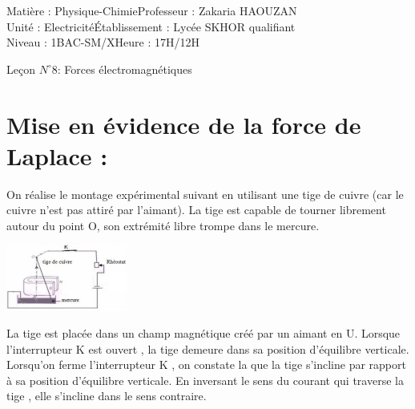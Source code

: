 \documentclass[12pt]{article}
\author{Zakaria HAOUZAN}
\date{\today}
\newcommand\headerMe[2]{\noindent{}#1\hfill#2}
\begin{document}
\headerMe{Matière : Physique-Chimie}{Professeur : Zakaria HAOUZAN}\\
\headerMe{Unité : Electricité}{Établissement : Lycée SKHOR qualifiant}\\
\headerMe{Niveau : 1BAC-SM/X}{Heure : 17H/12H}\\




\begin{center}

    \Large{Leçon $N^{\circ} 8 $: \color{red}Forces électromagnétiques }
\end{center}

  \section{ Mise en évidence de la force de Laplace :}
On réalise le montage expérimental suivant en utilisant une tige de cuivre (car le cuivre n'est pas attiré par l'aimant).
La tige est capable de tourner librement autour du point O, son extrémité libre trompe dans le mercure.
  \begin{center}
    \includegraphics[width=0.3\textwidth]{./img/foce_B.png}
  \end{center}
La tige est placée dans un champ magnétique créé par un aimant en U.
Lorsque l'interrupteur K est ouvert , la tige demeure dans sa position d'équilibre verticale. Lorsqu'on ferme
l'interrupteur K , on constate la que la tige s'incline par rapport à sa position d'équilibre verticale.
En inversant le sens du courant qui traverse la tige , elle s'incline dans le sens contraire.
\end{document}
